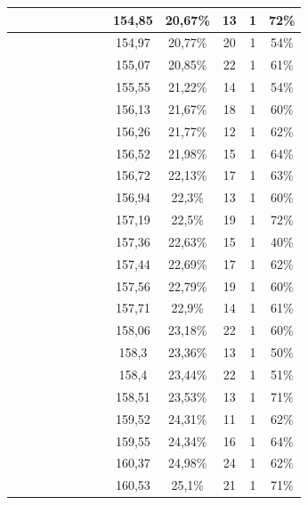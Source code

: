 \begin{center}
\begin{longtable}{|c|c|c|c|c|c|c|c|c|c|c|c|c|}
 \x &  \x &  &  &  &  \x &  \x &  & 154,85 & 20,67\% & 13 & 1 & 72\% \\ \hline
 \x &  \x &  &  \x &  &  &  \x &  & 154,97 & 20,77\% & 20 & 1 & 54\% \\ \hline
 \x &  \x &  &  \x &  \x &  &  \x &  \x & 155,07 & 20,85\% & 22 & 1 & 61\% \\ \hline
 \x &  \x &  &  \x &  &  &  \x &  \x & 155,55 & 21,22\% & 14 & 1 & 54\% \\ \hline
 \x &  &  &  &  \x &  &  \x &  \x & 156,13 & 21,67\% & 18 & 1 & 60\% \\ \hline
 \x &  \x &  \x &  \x &  \x &  &  &  & 156,26 & 21,77\% & 12 & 1 & 62\% \\ \hline
 \x &  &  \x &  \x &  &  &  \x &  \x & 156,52 & 21,98\% & 15 & 1 & 64\% \\ \hline
 \x &  &  \x &  \x &  \x &  &  \x &  & 156,72 & 22,13\% & 17 & 1 & 63\% \\ \hline
 \x &  \x &  &  \x &  \x &  &  &  & 156,94 & 22,3\% & 13 & 1 & 60\% \\ \hline
 \x &  &  \x &  &  &  \x &  \x &  & 157,19 & 22,5\% & 19 & 1 & 72\% \\ \hline
 \x &  &  &  &  &  &  \x &  \x & 157,36 & 22,63\% & 15 & 1 & 40\% \\ \hline
 \x &  &  \x &  \x &  \x &  &  &  \x & 157,44 & 22,69\% & 17 & 1 & 62\% \\ \hline
 \x &  \x &  &  &  \x &  &  \x &  \x & 157,56 & 22,79\% & 19 & 1 & 60\% \\ \hline
 \x &  \x &  \x &  &  &  &  \x &  & 157,71 & 22,9\% & 14 & 1 & 61\% \\ \hline
 \x &  &  &  \x &  \x &  &  \x &  & 158,06 & 23,18\% & 22 & 1 & 60\% \\ \hline
 \x &  \x &  &  \x &  &  &  &  & 158,3 & 23,36\% & 13 & 1 & 50\% \\ \hline
 \x &  &  &  \x &  &  &  \x &  \x & 158,4 & 23,44\% & 22 & 1 & 51\% \\ \hline
 \x &  &  &  &  &  \x &  \x &  & 158,51 & 23,53\% & 13 & 1 & 71\% \\ \hline
 \x &  \x &  \x &  \x &  \x &  &  \x &  \x & 159,52 & 24,31\% & 11 & 1 & 62\% \\ \hline
 \x &  &  \x &  \x &  &  &  \x &  & 159,55 & 24,34\% & 16 & 1 & 64\% \\ \hline
 \x &  &  \x &  \x &  \x &  &  \x &  \x & 160,37 & 24,98\% & 24 & 1 & 62\% \\ \hline
 \x &  \x &  &  \x &  \x &  \x &  &  \x & 160,53 & 25,1\% & 21 & 1 & 71\% \\ \hline

\end{longtable}
\end{center}
